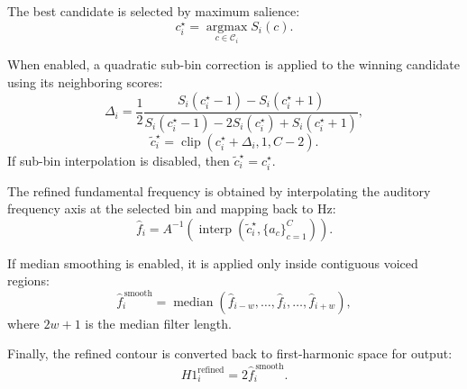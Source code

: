 The best candidate is selected by maximum salience:
\begin{equation}
    c_i^\star
    =
    \operatorname*{argmax}_{c \in \mathcal{C}_i}
    S_i(c).
\end{equation}

When enabled, a quadratic sub-bin correction is applied to the winning
candidate using its neighboring scores:
\begin{equation}
    \Delta_i
    =
    \frac{1}{2}
    \frac{
        S_i(c_i^\star - 1) - S_i(c_i^\star + 1)
    }{
        S_i(c_i^\star - 1)
        -
        2S_i(c_i^\star)
        +
        S_i(c_i^\star + 1)
    },
\end{equation}
\begin{equation}
    \tilde{c}_i^\star
    =
    \operatorname{clip}
    \left(
        c_i^\star + \Delta_i,
        1,
        C - 2
    \right).
\end{equation}
If sub-bin interpolation is disabled, then \(\tilde{c}_i^\star = c_i^\star\).

The refined fundamental frequency is obtained by interpolating the auditory
frequency axis at the selected bin and mapping back to Hz:
\begin{equation}
    \hat{f}_i
    =
    A^{-1}
    \left(
        \operatorname{interp}
        \left(
            \tilde{c}_i^\star,
            \{a_c\}_{c=1}^{C}
        \right)
    \right).
\end{equation}

If median smoothing is enabled, it is applied only inside contiguous voiced
regions:
\begin{equation}
    \hat{f}_i^{\,\mathrm{smooth}}
    =
    \operatorname{median}
    \left(
        \hat{f}_{i-w},
        \ldots,
        \hat{f}_{i},
        \ldots,
        \hat{f}_{i+w}
    \right),
\end{equation}
where \(2w+1\) is the median filter length.

Finally, the refined contour is converted back to first-harmonic space for
output:
\begin{equation}
    H1_i^{\mathrm{refined}}
    =
    2\hat{f}_i^{\,\mathrm{smooth}}.
\end{equation}

